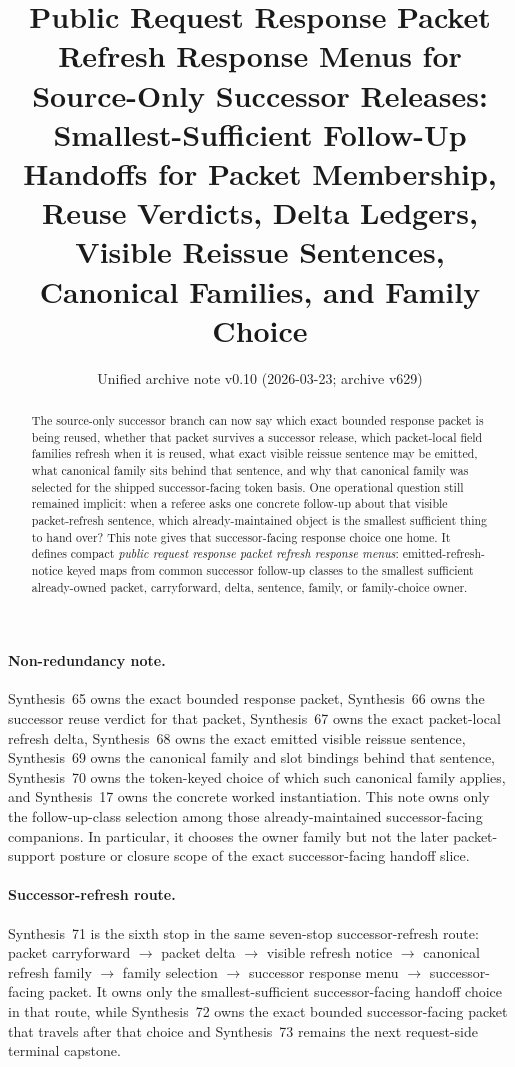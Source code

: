 \documentclass[11pt]{article}
\title{Public Request Response Packet Refresh Response Menus for Source-Only Successor Releases:\\[0.5ex]
\large Smallest-Sufficient Follow-Up Handoffs for Packet Membership, Reuse Verdicts, Delta Ledgers, Visible Reissue Sentences, Canonical Families, and Family Choice}
\author{}
\date{Unified archive note v0.10 (2026-03-23; archive v629)}
\begin{document}
\maketitle

\begin{abstract}
The source-only successor branch can now say which exact bounded response packet is being reused, whether that packet survives a successor release, which packet-local field families refresh when it is reused, what exact visible reissue sentence may be emitted, what canonical family sits behind that sentence, and why that canonical family was selected for the shipped successor-facing token basis. One operational question still remained implicit: when a referee asks one concrete follow-up about that visible packet-refresh sentence, which already-maintained object is the smallest sufficient thing to hand over? This note gives that successor-facing response choice one home. It defines compact \emph{public request response packet refresh response menus}: emitted-refresh-notice keyed maps from common successor follow-up classes to the smallest sufficient already-owned packet, carryforward, delta, sentence, family, or family-choice owner.
\end{abstract}

\paragraph{Non-redundancy note.}
Synthesis~65 owns the exact bounded response packet, Synthesis~66 owns the successor reuse verdict for that packet, Synthesis~67 owns the exact packet-local refresh delta, Synthesis~68 owns the exact emitted visible reissue sentence, Synthesis~69 owns the canonical family and slot bindings behind that sentence, Synthesis~70 owns the token-keyed choice of which such canonical family applies, and Synthesis~17 owns the concrete worked instantiation.\cite{series:publicrequestresponsepackets,series:publicrequestresponsepacketcarryforward,series:publicrequestresponsepacketdeltas,series:publicrequestresponsepacketrefreshnotices,series:publicrequestresponsepacketrefreshnoticenormalforms,series:publicrequestresponsepacketrefreshnoticeselections,series:workedexample}
This note owns only the follow-up-class selection among those already-maintained successor-facing companions. In particular, it chooses the owner family but not the later packet-support posture or closure scope of the exact successor-facing handoff slice.

\paragraph{Successor-refresh route.}
Synthesis~71 is the sixth stop in the same seven-stop successor-refresh route: packet carryforward $\rightarrow$ packet delta $\rightarrow$ visible refresh notice $\rightarrow$ canonical refresh family $\rightarrow$ family selection $\rightarrow$ successor response menu $\rightarrow$ successor-facing packet.
It owns only the smallest-sufficient successor-facing handoff choice in that route, while Synthesis~72 owns the exact bounded successor-facing packet that travels after that choice and Synthesis~73 remains the next request-side terminal capstone.
\end{document}
